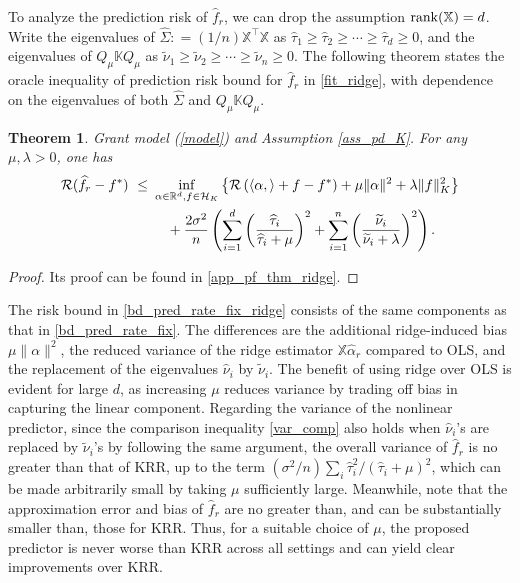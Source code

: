 \documentclass[11pt,twoside]{article}
\newtheorem{theorem}{Theorem}
\def\KK{\mathbb{K}}
\def\XX{\mathbb{X}}
\def\RR{\mathbb{R}}
\def\cH{\mathcal H}
\def\cR{\mathcal R}
\def\wh{\widehat}
\def\wt{\widetilde}
\def\T{\top}
\def\l{\left}
\def\r{\right}
\newcommand{\rank}{\ensuremath{{\rm rank}}}
\begin{document}
To analyze the prediction risk of $\wh f_r$, we can drop the assumption $\rank(\XX)=d$.
Write the eigenvalues of $\wh \Sigma : =  (1/n) \XX^\T\XX $ as $\wh \tau_1\ge\wh \tau_2\ge\cdots\ge \wh \tau_d\ge0$, and the eigenvalues of $Q_\mu \KK Q_\mu$ as $\wt \nu_1 \ge \wt \nu_2 \ge \cdots \ge \wt \nu_n \ge 0$.  
The following theorem states the oracle inequality of prediction risk bound for 
$\wh f_r$ in \eqref{fit_ridge}, with dependence on  the eigenvalues of both $ \wh \Sigma  $ and  $Q_\mu \KK Q_\mu$.


\begin{theorem}\label{thm_fix_ridge}
Grant model (\ref{model}) and
Assumption  \ref{ass_pd_K}. 
For any $\mu, \lambda >0$, one has
\begin{equation}
    \label{bd_pred_rate_fix_ridge}
   \begin{aligned}
  \cR( \wh  f_r -f^*)  ~ \le~    & \inf_{\alpha \in \RR^d, f\in \cH_K}\left\{  \cR\l(\langle \alpha,\rangle + f-f^* \r)+\mu\|\alpha\|^2 +  \lambda \|f\|_K^2  \right\} \\
  & \quad + {2\sigma^2 \over n}  \left( \sum_{i=1}^d \left(\wh\tau_i\over \wh\tau_i  + \mu \right)^2  + \sum_{i=1}^n \left(\wt \nu_i\over \wt\nu_i + \lambda\right)^2\right).
\end{aligned}     
\end{equation}
\end{theorem}
\begin{proof}
    Its proof can be found in \cref{app_pf_thm_ridge}.
\end{proof}


The risk bound in \eqref{bd_pred_rate_fix_ridge} consists of the same components as that in \eqref{bd_pred_rate_fix}.
The differences are the additional ridge-induced bias $\mu\|\alpha\|^2$, the reduced variance of the ridge estimator $\XX \wh \alpha_r$ compared to OLS, and the replacement of the eigenvalues ${\wh \nu_i}$ by ${\wt \nu_i}$.
The benefit of using ridge over OLS is evident for large $d$, as increasing $\mu$ reduces variance by trading off bias in capturing the linear component. Regarding the variance of the nonlinear predictor, since
 the comparison inequality  \eqref{var_comp} also holds when $\wh \nu_i$'s are replaced by $\wt \nu_i$'s by following the same argument, the overall variance of $\wh f_r$ is no greater than that of KRR, up to the term $(\sigma^2/n)\sum_i \wh\tau_i^2/(\wh\tau_i+\mu)^2$, which can be made arbitrarily small by taking $\mu$ sufficiently large. Meanwhile, note that the approximation error and bias of $\wh f_r$ are no greater than, and can be substantially smaller than, those for KRR. Thus, for a suitable choice of $\mu$, the proposed predictor is never worse than KRR across all settings and can yield clear improvements over KRR. 
\end{document}
